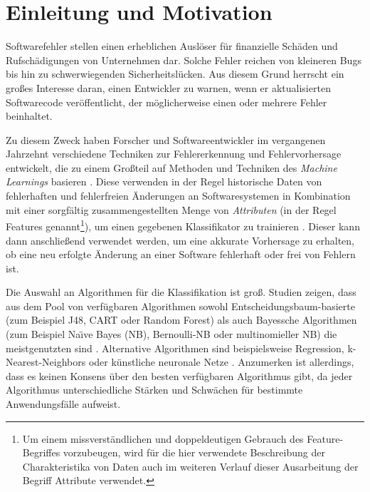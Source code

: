 
\chapter{Einleitung und Motivation}
\label{introduction}

Softwarefehler stellen einen erheblichen Auslöser für finanzielle Schäden und Rufschädigungen von Unternehmen dar. Solche Fehler reichen von kleineren \glqq Bugs\grqq{} bis hin zu schwerwiegenden Sicherheitslücken. Aus diesem Grund herrscht ein großes Interesse daran, einen Entwickler zu warnen, wenn er aktualisierten Softwarecode veröffentlicht, der möglicherweise einen oder mehrere Fehler beinhaltet. 

Zu diesem Zweck haben Forscher und Softwareentwickler im vergangenen Jahrzehnt verschiedene Techniken zur Fehlererkennung und Fehlervorhersage entwickelt, die zu einem Großteil auf Methoden und Techniken des \emph{Machine Learnings} basieren \cite{Challagulla2008}. Diese verwenden in der Regel historische Daten von fehlerhaften und fehlerfreien Änderungen an Softwaresystemen in Kombination mit einer sorgfältig zusammengestellten Menge von \emph{Attributen} (in der Regel Features genannt\footnote{Um einem missverständlichen und doppeldeutigen Gebrauch des Feature-Begriffes vorzubeugen, wird für die hier verwendete Beschreibung der Charakteristika von Daten auch im weiteren Verlauf dieser Ausarbeitung der Begriff \glqq Attribute\grqq{} verwendet.}), um einen gegebenen Klassifikator zu trainieren \cite{Alsaeedi2019,Hammouri2018}. Dieser kann dann anschließend verwendet werden, um eine akkurate Vorhersage zu erhalten, ob eine neu erfolgte Änderung an einer Software fehlerhaft oder frei von Fehlern ist.

Die Auswahl an Algorithmen für die Klassifikation ist groß. Studien zeigen, dass aus dem Pool von verfügbaren Algorithmen sowohl Entscheidungsbaum-basierte (zum Beispiel J48, CART oder Random Forest) als auch Bayessche Algorithmen (zum Beispiel Na\"{\i}ve Bayes (NB), Bernoulli-NB oder multinomieller NB) die meistgenutzten sind \cite{Son2019}. Alternative Algorithmen sind beispielsweise Regression, k-Nearest-Neighbors oder künstliche neuronale Netze \cite{Challagulla2008}. Anzumerken ist allerdings, dass es keinen Konsens über den besten verfügbaren Algorithmus gibt, da jeder Algorithmus unterschiedliche Stärken und Schwächen für bestimmte Anwendungsfälle aufweist.

